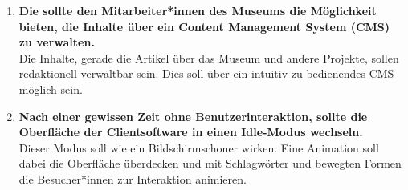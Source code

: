 \begin{enumerate}[label=\textbf{FA\arabic*}]
  \item\label{fa7} \textbf{Die \shst{} sollte den Mitarbeiter*innen des Museums die Möglichkeit bieten, die Inhalte über ein Content
  Management System (CMS) zu verwalten.}\\
  Die Inhalte, gerade die Artikel über das Museum und andere Projekte, sollen redaktionell verwaltbar sein. Dies soll über ein 
  intuitiv zu bedienendes CMS möglich sein. 
  \item\label{fa8} \textbf{Nach einer gewissen Zeit ohne Benutzerinteraktion, sollte die Oberfläche der Clientsoftware in einen
  Idle-Modus wechseln.}\\
  Dieser Modus soll wie ein Bildschirmschoner wirken. Eine Animation soll dabei die Oberfläche überdecken und mit Schlagwörter und bewegten Formen
  die Besucher*innen zur Interaktion animieren. 
\end{enumerate}
